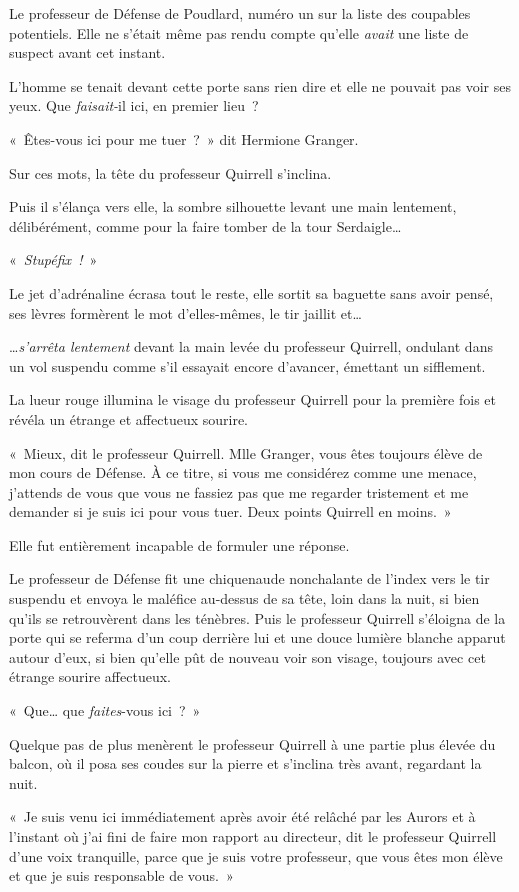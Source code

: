 Le professeur de Défense de Poudlard, numéro un sur la liste des coupables potentiels.
Elle ne s'était même pas rendu compte qu'elle \emph{avait} une liste de suspect avant cet instant.

L'homme se tenait devant cette porte sans rien dire et elle ne pouvait pas voir ses yeux.
Que \emph{faisait-}il ici, en premier lieu~?

«~Êtes-vous ici pour me tuer~?~»
dit Hermione Granger.

Sur ces mots, la tête du professeur Quirrell s'inclina.

Puis il s'élança vers elle, la sombre silhouette levant une main lentement, délibérément, comme pour la faire tomber de la tour Serdaigle…

«~\emph{Stupéfix~!}~»

Le jet d'adrénaline écrasa tout le reste, elle sortit sa baguette sans avoir pensé, ses lèvres formèrent le mot d'elles-mêmes, le tir jaillit et…

…\emph{s'arrêta lentement} devant la main levée du professeur Quirrell, ondulant dans un vol suspendu comme s'il essayait encore d'avancer, émettant un sifflement.

La lueur rouge illumina le visage du professeur Quirrell pour la première fois et révéla un étrange et affectueux sourire.

«~Mieux, dit le professeur Quirrell.
Mlle Granger, vous êtes toujours élève de mon cours de Défense.
À ce titre, si vous me considérez comme une menace, j'attends de vous que vous ne fassiez pas que me regarder tristement et me demander si je suis ici pour vous tuer.
Deux points Quirrell en moins.~»

Elle fut entièrement incapable de formuler une réponse.

Le professeur de Défense fit une chiquenaude nonchalante de l'index vers le tir suspendu et envoya le maléfice au-dessus de sa tête, loin dans la nuit, si bien qu'ils se retrouvèrent dans les ténèbres.
Puis le professeur Quirrell s'éloigna de la porte qui se referma d'un coup derrière lui et une douce lumière blanche apparut autour d'eux, si bien qu'elle pût de nouveau voir son visage, toujours avec cet étrange sourire affectueux.

«~Que… que \emph{faites}-vous ici~?~»

Quelque pas de plus menèrent le professeur Quirrell à une partie plus élevée du balcon, où il posa ses coudes sur la pierre et s'inclina très avant, regardant la nuit.

«~Je suis venu ici immédiatement après avoir été relâché par les Aurors et à l'instant où j'ai fini de faire mon rapport au directeur, dit le professeur Quirrell d'une voix tranquille, parce que je suis votre professeur, que vous êtes mon élève et que je suis responsable de vous.~»

